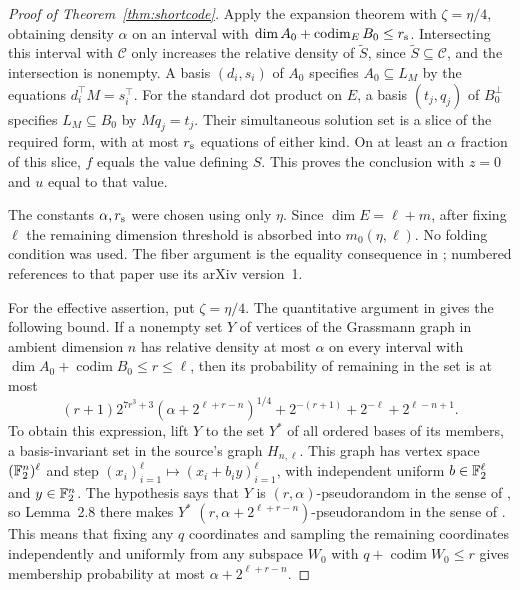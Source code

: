 \begin{proof}[Proof of Theorem~\ref{thm:shortcode}]
Apply the expansion theorem with $\zeta=\eta/4$, obtaining density
$\alpha$ on an interval with
$\dim A_0+\operatorname{codim}_E B_0\le r_{\rm s}$.  Intersecting
this interval with $\mathcal C$ only increases the relative density of
$\widetilde S$, since $\widetilde S\subseteq\mathcal C$, and the
intersection is nonempty.  A basis $(d_i,s_i)$ of $A_0$ specifies
$A_0\subseteq L_M$ by the equations $d_i^\top M=s_i^\top$.
For the standard dot product on $E$, a basis $(t_j,q_j)$ of
$B_0^\perp$ specifies $L_M\subseteq B_0$ by
$Mq_j=t_j$.  Their simultaneous solution set is a slice of the required
form, with at most $r_{\rm s}$ equations of either kind.  On at least an
$\alpha$ fraction of this slice, $f$ equals the value defining $S$.
This proves the conclusion with $z=0$ and $u$ equal to that value.

The constants $\alpha,r_{\rm s}$ were chosen using only $\eta$.
Since $\dim E=\ell+m$, after fixing $\ell$ the remaining dimension
threshold is absorbed into $m_0(\eta,\ell)$.  No folding condition was
used.  The fiber argument is the equality consequence in
\cite[Lemma~2.3]{BKS18}; numbered references to that paper use its
arXiv version~1.

For the effective assertion, put $\zeta=\eta/4$.  The quantitative
argument in \cite[Section~2.4, Theorem~2.13, and Lemmas~2.7--2.8]{KMS23}
gives the following bound.  If a nonempty set $Y$ of vertices of the
Grassmann graph in ambient dimension $n$ has relative density at most
$\alpha$ on every interval
with $\dim A_0+\operatorname{codim}B_0\le r\le\ell$, then its
probability of remaining in the set is at most
\begin{equation}
 (r+1)2^{7r^3+3}(\alpha+2^{\ell+r-n})^{1/4}
       +2^{-(r+1)}+2^{-\ell}+2^{\ell-n+1}.
 \label{eq:effective-grassmann-staying-probability}
\end{equation}
To obtain this expression, lift $Y$ to the set $Y^*$ of all ordered bases
of its members, a basis-invariant set in the source's graph $H_{n,\ell}$.
This graph has vertex space $(\mathbb F_2^n)^\ell$ and step
$(x_i)_{i=1}^\ell\mapsto(x_i+b_i y)_{i=1}^\ell$, with independent
uniform $b\in\mathbb F_2^\ell$ and $y\in\mathbb F_2^n$.
The hypothesis says that $Y$ is $(r,\alpha)$-pseudorandom in the sense of
\cite[Definition~2.3]{KMS23}, so Lemma~2.8 there makes $Y^*$
$(r,\alpha+2^{\ell+r-n})$-pseudorandom in the sense of
\cite[Definition~2.5]{KMS23}.  This means that fixing any $q$ coordinates
and sampling the remaining coordinates independently and uniformly from
any subspace $W_0$ with $q+\operatorname{codim}W_0\le r$ gives membership
probability at most $\alpha+2^{\ell+r-n}$.


\end{proof}
